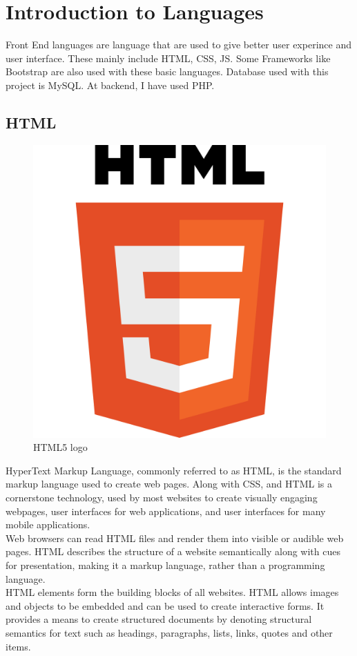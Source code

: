 \section{Introduction to Languages}
Front End languages are language that are used to give better user experince and user interface. These mainly include HTML, CSS, JS. Some Frameworks like Bootstrap are also used with these basic languages. Database used with this project is MySQL. At backend, I have used PHP.
\subsection{HTML}

\begin{figure}[h]
\centering \includegraphics[scale=0.05]{input/images/HTML.png}
\caption{HTML5 logo}
\end{figure}
HyperText Markup Language, commonly referred to as HTML, is the standard markup language used to create web pages. Along with CSS, and HTML is a cornerstone technology, used by most websites to create visually engaging webpages, user interfaces for web applications, and user interfaces for many mobile applications. \\
Web browsers can read HTML files and render them into visible or audible web pages. HTML describes the structure of a website semantically along with cues for presentation, making it a markup language, rather than a programming language.\\
HTML elements form the building blocks of all websites. HTML allows images and objects to be embedded and can be used to create interactive forms. It provides a means to create structured documents by denoting structural semantics for text such as headings, paragraphs, lists, links, quotes and other items.

